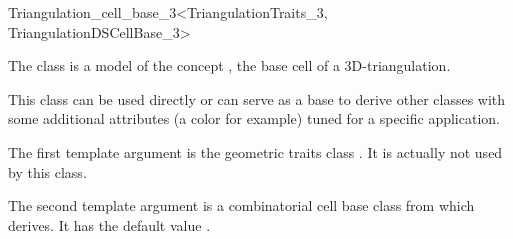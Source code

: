 

\begin{ccRefClass}{Triangulation_cell_base_3<TriangulationTraits_3, TriangulationDSCellBase_3>}

\ccDefinition

The class  is a model of the concept
, the base cell of a 3D-triangulation.

This class can be used directly or can serve as a base to derive other classes
with some additional attributes (a color for example) tuned for a specific
application.


\ccParameters

The first template argument is the geometric traits class
.  It is actually not used by this class.

The second template argument is a combinatorial cell base class from which
 derives.
It has the default value .

\ccIsModel {}

\ccInheritsFrom {}

\ccSeeAlso

\\



\end{ccRefClass}

